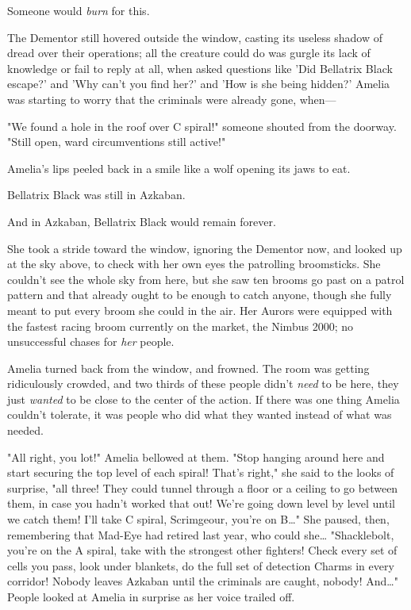 Someone would \emph{burn} for this.

The Dementor still hovered outside the window, casting its useless shadow of 
dread over their operations; all the creature could do was gurgle its lack of 
knowledge or fail to reply at all, when asked questions like 'Did Bellatrix 
Black escape?' and 'Why can't you find her?' and 'How is she being hidden?' 
Amelia was starting to worry that the criminals were already gone, when---

"We found a hole in the roof over C spiral!" someone shouted from the doorway. 
"Still open, ward circumventions still active!"

Amelia's lips peeled back in a smile like a wolf opening its jaws to eat.

Bellatrix Black was still in Azkaban.

And in Azkaban, Bellatrix Black would remain forever.

She took a stride toward the window, ignoring the Dementor now, and looked up 
at the sky above, to check with her own eyes the patrolling broomsticks. She 
couldn't see the whole sky from here, but she saw ten brooms go past on a 
patrol pattern and that already ought to be enough to catch anyone, though she 
fully meant to put every broom she could in the air. Her Aurors were equipped 
with the fastest racing broom currently on the market, the Nimbus 2000; no 
unsuccessful chases for \emph{her} people.

Amelia turned back from the window, and frowned. The room was getting 
ridiculously crowded, and two thirds of these people didn't \emph{need} to be 
here, they just \emph{wanted} to be close to the center of the action. If there 
was one thing Amelia couldn't tolerate, it was people who did what they wanted 
instead of what was needed.

"All right, you lot!" Amelia bellowed at them. "Stop hanging around here and 
start securing the top level of each spiral! That's right," she said to the 
looks of surprise, "all three! They could tunnel through a floor or a ceiling 
to go between them, in case you hadn't worked that out! We're going down level 
by level until we catch them! I'll take C spiral, Scrimgeour, you're on 
B{\ldots}" She paused, then, remembering that Mad-Eye had retired last year, 
who could she{\ldots} "Shacklebolt, you're on the A spiral, take with the 
strongest other fighters! Check every set of cells you pass, look under 
blankets, do the full set of detection Charms in every corridor! Nobody leaves 
Azkaban until the criminals are caught, nobody! And{\ldots}" People looked at 
Amelia in surprise as her voice trailed off.

